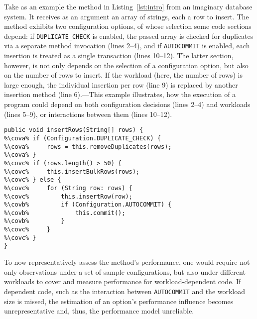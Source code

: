 Take as an example the method in Listing~\ref{lst:intro} from an imaginary database system. It receives as an argument an array of strings, each a row to insert. The method exhibits two configuration options, of whose selection some code sections depend: if \texttt{DUPLICATE\_CHECK} is enabled, the passed array is checked for duplicates via a separate method invocation (lines 2--4), and if \texttt{AUTOCOMMIT} is enabled, each insertion is treated as a single transaction (lines 10--12). The latter section, however, is not only depends on the selection of a configuration option, but also on the number of rows to insert. If the workload (here, the number of rows) is large enough, the individual insertion per row (line 9) is replaced by another insertion method (line 6).---This example illustrates, how the execution of a program could depend on both configuration decisions (lines 2--4) and workloads (lines 5--9), or interactions between them (lines 10--12).
\begin{lstlisting}[caption={Illustrative code example of option-dependent code, workload-dependent code, and interaction-dependent code.},label=lst:intro, escapechar=\%,float]
public void insertRows(String[] rows) {
%\cova%	if (Configuration.DUPLICATE_CHECK) {
%\cova%		rows = this.removeDuplicates(rows);
%\cova%	}
%\covc%	if (rows.length() > 50) {
%\covc%		this.insertBulkRows(rows);
%\covc%	} else {
%\covc%		for (String row: rows) {
%\covc%			this.insertRow(row);
%\covb%			if (Configuration.AUTOCOMMIT) {
%\covb%				this.commit();
%\covb%			}	
%\covc%		}
%\covc%	}
}
\end{lstlisting}
To now representatively assess the method's performance, one would require not only observations under a set of sample configurations, but also under different workloads to cover and measure performance for workload-dependent code. If dependent code, such as the interaction between \texttt{AUTOCOMMIT} and the workload size is missed, the estimation of an option's performance influence becomes unrepresentative and, thus, the performance model unreliable.

